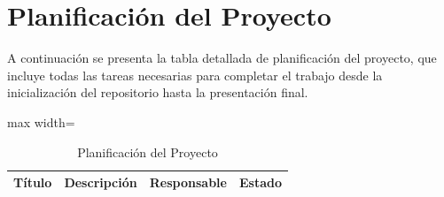 \chapter{Planificación del Proyecto}
\label{AppendixA}

A continuación se presenta la tabla detallada de planificación del proyecto, que incluye todas las tareas necesarias para completar el trabajo desde la inicialización del repositorio hasta la presentación final.

\begin{table}[h]
\centering
\caption{Planificación del Proyecto}
\label{tab:planificacion1}

\begin{adjustbox}{max width=\textwidth}
\footnotesize
\begin{tabular}{p{3.3cm} p{9cm} p{1.7cm} p{1.5cm}}
\toprule
\textbf{Título} & \textbf{Descripción} & \textbf{Responsable} & \textbf{Estado} \\
\midrule


\end{tabular}
\end{adjustbox}
\end{table}
